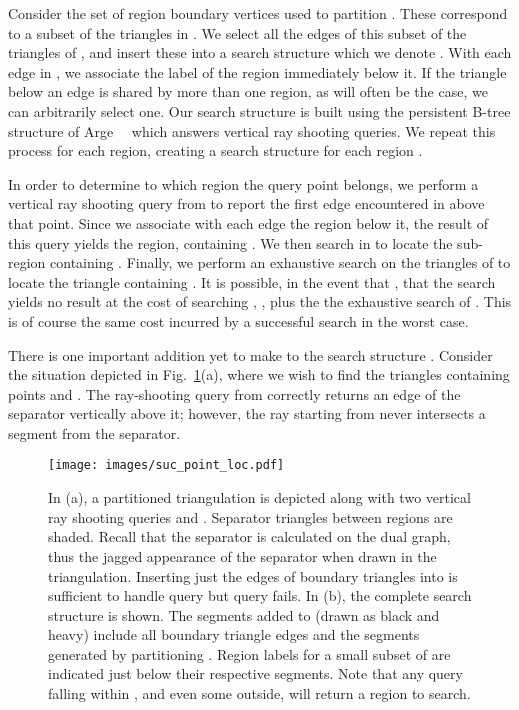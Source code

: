 Consider the set of region boundary vertices used to partition . 
These correspond to a subset of the triangles in .
We select all the edges of this subset of the triangles of ,
and insert these into a search structure which we denote .
With each edge in , we associate the label of the region
immediately below it.
If the triangle below an edge is shared by more than one region, as
will often be the case, we can arbitrarily select one. 
Our search structure  is built using the persistent B-tree structure of 
Arge~\etal~\cite{DBLP:conf/alenex/ArgeDT03} which answers vertical
ray shooting queries.
We repeat this process for each region, creating a search structure
 for each region .


In order to determine to which region the query point  belongs, we perform a vertical 
ray shooting query from  to report the first edge encountered in 
above that point. 
Since we associate with each edge the region below it, the result of this query 
yields the region,  containing .
We then search in  to locate the sub-region  containing .
Finally, we perform an exhaustive search on the triangles of 
to locate the triangle containing .
It is possible, in the event that , that the search yields
no result at the cost of searching , , plus the
the exhaustive search of .
This is of course the same cost incurred by a successful search in the worst
case.

There is one important addition yet to make to the search structure .
Consider the situation depicted in Fig.~\ref{fig:pl_structure}(a), where
we wish to find the triangles containing points  and . 
The ray-shooting query from  correctly returns an edge of the separator
vertically above it; however, the ray starting from  never intersects a 
segment from the separator.

\begin{figure}
  \texttt{[image: images/suc\_point\_loc.pdf]}
  \caption[Point location by vertical ray shooting]{In (a), a 
    partitioned triangulation is depicted along with two vertical
    ray shooting queries  and .
    Separator triangles between regions are shaded.
    Recall that the separator is calculated on the dual graph, thus
    the jagged appearance of the separator when drawn in the 
    triangulation.
    Inserting just the edges of boundary triangles into  is 
    sufficient to handle query  but query  fails.
    In (b), the complete search structure is shown.
    The segments added to  (drawn as black and heavy) 
    include all boundary triangle edges and the segments generated
    by partitioning .
    Region labels for a small subset of  are indicated just below
    their respective segments.
    Note that any query falling within , and even some outside,
    will return a region to search.
  }
  \label{fig:pl_structure}
\end{figure}
              
